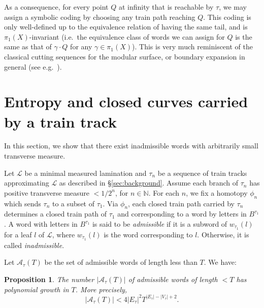 \documentclass[11pt]{article} %
\theoremstyle{plain}
\newtheorem{prop}[thm]{Proposition}
\theoremstyle{definition}
\numberwithin{equation}{section}
\begin{document}
As a consequence, for every point $Q$ at infinity that is reachable by $\tau$, we may assign a symbolic coding by choosing any train path reaching $Q$. This coding is only well-defined up to the equivalence relation of having the same tail, and is $\pi_1(X)$-invariant (i.e.\ the equivalence class of words we can assign for $Q$ is the same as that of $\gamma\cdot Q$ for any $\gamma\in\pi_1(X)$). This is very much reminiscent of the classical cutting sequences for the modular surface, or boundary expansion in general (see e.g.\ \cite{simple}).


\section{Entropy and closed curves carried by a train track}\label{sec:carry}
In this section, we show that there exist inadmissible words with arbitrarily small transverse measure.

Let $\mathcal{L}$ be a minimal measured lamination and  $\tau_n$ be a sequence of train tracks approximating $\mathcal{L}$ as described in \S\ref{sec:background}. Assume each branch of $\tau_n$ has positive transverse measure $<1/2^n$, for $n \in \mathbb{N}$. For each $n$, we fix a homotopy $\phi_n$ which sends $\tau_n$ to a subset of $\tau_1$. Via $\phi_n$, each closed train path carried by $\tau_n$ determines a closed train path of $\tau_1$ and corresponding to a word by letters in $B^{\tau_1}$. A word with letters in $B^{\tau_1}$ is said to be \emph{admissible} if it is a subword of $w_{\tau_1}(l)$ for a leaf $l$ of $\mathcal{L}$, where $w_{\tau_1}(l)$ is the word corresponding to $l$. Otherwise, it is called \emph{inadmissible}.




Let $\mathcal{A}_\tau(T)$ be the set of admissible words of length less than $T$. We have:

\begin{prop}\label{prop:ent.poly}
The number $|\mathcal{A}_\tau(T)|$ of admissible words of length $<T$ has polynomial growth in $T$. More precisely, $$|\mathcal{A}_\tau(T)|< 4|E_{\tau}|^2T^{|E_{\tau}|-|V_\tau|+2}.$$
\end{prop}
\end{document}
